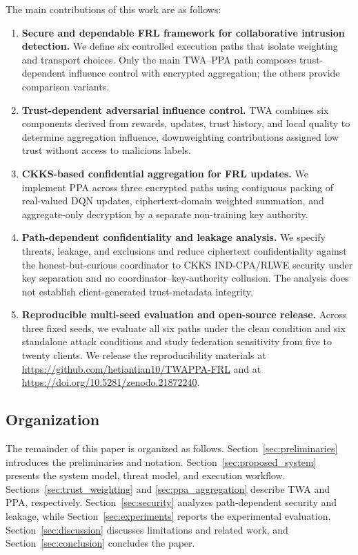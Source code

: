 \documentclass[journal]{IEEEtran}
\begin{document}
The main contributions of this work are as follows:


\begin{enumerate}
  \item \textbf{Secure and dependable FRL framework for collaborative intrusion detection.}
  We define six controlled execution paths that isolate weighting and transport
  choices. Only the main TWA--PPA path composes trust-dependent influence control
  with encrypted aggregation; the others provide comparison variants.

  \item \textbf{Trust-dependent adversarial influence control.}
  TWA combines six components derived from rewards, updates, trust history, and local
  quality to determine aggregation influence, downweighting contributions assigned low
  trust without access to malicious labels.

  \item \textbf{CKKS-based confidential aggregation for FRL updates.}
  We implement PPA across three encrypted paths using contiguous packing of
  real-valued DQN updates, ciphertext-domain weighted summation, and
  aggregate-only decryption by a separate non-training key authority.

  \item \textbf{Path-dependent confidentiality and leakage analysis.}
  We specify threats, leakage, and exclusions and reduce ciphertext
  confidentiality against the honest-but-curious coordinator to CKKS IND-CPA/RLWE
  security under key separation and no coordinator--key-authority collusion. The
  analysis does not establish client-generated trust-metadata integrity.

  \item \textbf{Reproducible multi-seed evaluation and open-source release.}
  Across three fixed seeds, we evaluate all six paths under the clean condition and six
  standalone attack conditions and study federation sensitivity from five to
  twenty clients. We release the reproducibility materials at
  \url{https://github.com/hetiantian10/TWAPPA-FRL} and at 
  \url{https://doi.org/10.5281/zenodo.21872240}.
\end{enumerate}

\subsection{Organization}

The remainder of this paper is organized as follows.
Section~\ref{sec:preliminaries} introduces the preliminaries and notation.
Section~\ref{sec:proposed_system} presents the system model, threat model, and
execution workflow. Sections~\ref{sec:trust_weighting} and
\ref{sec:ppa_aggregation} describe TWA and PPA, respectively.
Section~\ref{sec:security} analyzes path-dependent security and leakage, while
Section~\ref{sec:experiments} reports the experimental evaluation.
Section~\ref{sec:discussion} discusses limitations and related work, and
Section~\ref{sec:conclusion} concludes the paper.
\end{document}
